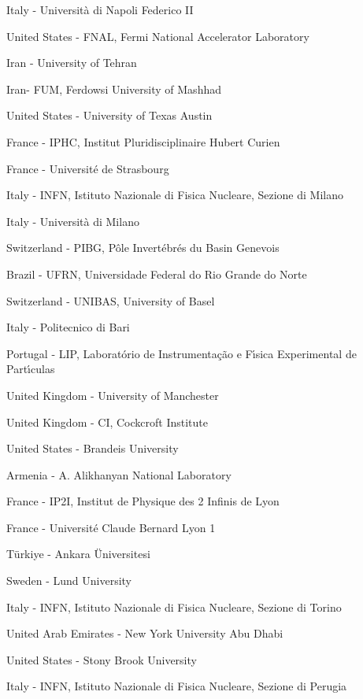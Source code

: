\item[$^{47}$] Italy - Universit{\`a} di Napoli Federico II
\item[$^{48}$] United States - FNAL, Fermi National Accelerator Laboratory
\item[$^{49}$] Iran - University of Tehran
\item[$^{50}$] Iran- FUM, Ferdowsi University of Mashhad
\item[$^{51}$] United States - University of Texas Austin
\item[$^{52}$] France - IPHC, Institut Pluridisciplinaire Hubert Curien
\item[$^{53}$] France - Universit{\'e} de Strasbourg
\item[$^{54}$] Italy - INFN, Istituto Nazionale di Fisica Nucleare, Sezione di Milano
\item[$^{55}$] Italy - Universit{\`a} di Milano
\item[$^{56}$] Switzerland - PIBG, P{\^o}le Invert{\'e}br{\'e}s du Basin Genevois
\item[$^{57}$] Brazil - UFRN, Universidade Federal do Rio Grande do Norte
\item[$^{58}$] Switzerland - UNIBAS, University of Basel
\item[$^{59}$] Italy - Politecnico di Bari
\item[$^{60}$] Portugal - LIP, Laborat{\'o}rio de Instrumenta{\c c}{\~a}o e F{\'\i}sica Experimental de Part{\'\i}culas
\item[$^{61}$] United Kingdom - University of Manchester
\item[$^{62}$] United Kingdom - CI, Cockcroft Institute
\item[$^{63}$] United States - Brandeis University
\item[$^{64}$] Armenia - A. Alikhanyan National Laboratory
\item[$^{65}$] France - IP2I, Institut de Physique des 2 Infinis de Lyon
\item[$^{66}$] France - Universit{\'e} Claude Bernard Lyon 1
\item[$^{67}$] T{\"u}rkiye - Ankara {\"U}niversitesi
\item[$^{68}$] Sweden - Lund University
\item[$^{69}$] Italy - INFN, Istituto Nazionale di Fisica Nucleare, Sezione di Torino
\item[$^{70}$] United Arab Emirates - New York University Abu Dhabi
\item[$^{71}$] United States - Stony Brook University
\item[$^{72}$] Italy - INFN, Istituto Nazionale di Fisica Nucleare, Sezione di Perugia
